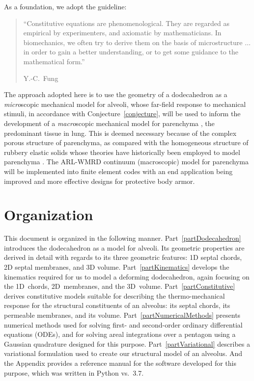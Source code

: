 As a foundation, we adopt the guideline:
\begin{quotation}
	\noindent\small ``Constitutive equations are phenomenological. They are regarded as empirical by experimenters, and axiomatic by mathematicians.  In biomechanics, we often try to derive them on the basis of micro\-structure $\ldots$ in order to gain a better understanding, or to get some guidance to the mathematical form.''
	
	\nopagebreak
	\mbox{} \hfill Y.-C.~Fung \cite[pg.~431]{Fung90} \normalsize
\end{quotation}
The approach adopted here is to use the geometry of a dodecahedron as a \textit{micro\/}scopic mechanical model for alveoli, whose far-field response to mechanical stimuli, in accordance with Conjecture~\ref{conjecture}, will be used to inform the development of a \textit{macro\/}scopic mechanical model for parenchyma \cite{ClaytonFreed19}, the predominant tissue in lung.  This is deemed necessary because of the complex porous structure of parenchyma, as compared with the homo\-geneous structure of rubbery elastic solids whose theories have historically been employed to model parenchyma \cite{Fung75,Fungetal78,Vawteretal79,Fung88}.  The ARL-WMRD continuum (macroscopic) model for parenchyma \cite{ClaytonFreed19} will be implemented into finite element codes with an end application being improved and more effective designs for protective body armor. 

\section{Organization}

This document is organized in the following manner.  Part~\ref{partDodecahedron} introduces the dodecahedron as a model for alveoli.  Its geometric properties are derived in detail with regards to its three geometric features: 1D septal chords, 2D septal membranes, and 3D volume.  Part~\ref{partKinematics} develops the kinematics required for us to model a deforming dodecahedron, again focusing on the 1D~chords, 2D~membranes, and the 3D~volume.  Part~\ref{partConstitutive} derives constitutive models suitable for describing the thermo-mechanical response for the structural constituents of an alveolus: its septal chords, its permeable membranes, and its volume.  Part~\ref{partNumericalMethods} presents numerical methods used for solving first- and second-order ordinary differential equations (ODEs), and for solving areal integrations over a pentagon using a Gaussian quadrature designed for this purpose.  Part~\ref{partVariational} describes a variational formulation used to create our structural model of an alveolus.  And the Appendix provides a reference manual for the software developed for this purpose, which was written in Python vs.~3.7.
